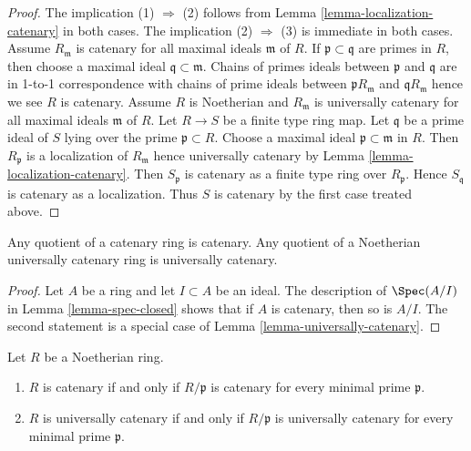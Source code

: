 \begin{proof}
The implication (1) $\Rightarrow$ (2) follows from
Lemma \ref{lemma-localization-catenary} in both cases.
The implication (2) $\Rightarrow$ (3) is immediate in both cases.
Assume $R_\mathfrak m$ is catenary for all maximal ideals
$\mathfrak m$ of $R$. If $\mathfrak p \subset \mathfrak q$ are primes
in $R$, then choose a maximal ideal $\mathfrak q \subset \mathfrak m$.
Chains of primes ideals between $\mathfrak p$ and $\mathfrak q$ are
in 1-to-1 correspondence with chains of prime ideals between
$\mathfrak pR_\mathfrak m$ and $\mathfrak qR_\mathfrak m$ hence we
see $R$ is catenary. Assume $R$ is Noetherian and $R_\mathfrak m$ is
universally catenary for all maximal ideals $\mathfrak m$ of $R$.
Let $R \to S$ be a finite type ring map. Let $\mathfrak q$ be a prime
ideal of $S$ lying over the prime $\mathfrak p \subset R$.
Choose a maximal ideal $\mathfrak p \subset \mathfrak m$ in $R$.
Then $R_\mathfrak p$ is a localization of $R_\mathfrak m$ hence
universally catenary by Lemma \ref{lemma-localization-catenary}.
Then $S_\mathfrak p$ is catenary as a finite type ring over $R_\mathfrak p$.
Hence $S_\mathfrak q$ is catenary as a localization. Thus $S$ is catenary
by the first case treated above.
\end{proof}

\begin{lemma}
\label{lemma-quotient-catenary}
Any quotient of a catenary ring is catenary.
Any quotient of a Noetherian universally catenary ring is
universally catenary.
\end{lemma}

\begin{proof}
Let $A$ be a ring and let $I \subset A$ be an ideal.
The description of $\Spec(A/I)$ in Lemma \ref{lemma-spec-closed}
shows that if $A$ is catenary, then so is $A/I$.
The second statement is a special case of
Lemma \ref{lemma-universally-catenary}.
\end{proof}

\begin{lemma}
\label{lemma-catenary-check-irreducible}
Let $R$ be a Noetherian ring.
\begin{enumerate}
\item $R$ is catenary if and only if $R/\mathfrak p$ is catenary
for every minimal prime $\mathfrak p$.
\item $R$ is universally catenary if and only if $R/\mathfrak p$ is
universally catenary for every minimal prime $\mathfrak p$.
\end{enumerate}
\end{lemma}

